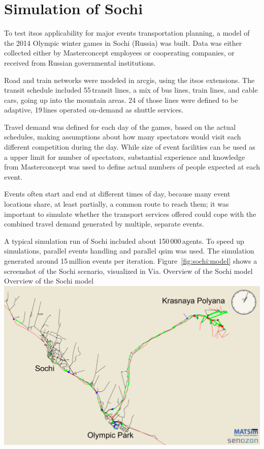 \section{Simulation of Sochi}
To test \gls{itsos} applicability for major events transportation planning,
a model of the 2014 Olympic winter games in Sochi (Russia) was built. Data was
either collected either by Masterconcept employees or cooperating companies, or
received from Russian governmental institutions.

Road and train networks were modeled in \gls{arcgis}, using the \gls{itsos} extensions.
The transit schedule included 55\,transit lines, a mix of bus lines, train lines,
and cable cars, going up into the mountain areas. 24 of those lines were
defined to be adaptive, 19\,lines operated on-demand as shuttle services.

Travel demand was defined for each day of the games, based on the actual schedules,
making assumptions about how many spectators would visit each different
competition during the day. While size of event facilities can be used as a
upper limit for number of spectators, substantial experience and knowledge from
Masterconcept was used to define actual numbers of people expected at each
event.

Events often start and end at different times of day, because many event locations share, at least partially, a
common route to reach them; it was important to simulate whether the transport services offered could
cope with the combined travel demand generated by multiple, separate events.

A typical simulation run of Sochi included about 150\,000\,agents. To speed up simulations, parallel events handling and parallel qsim was used. The simulation generated around 15\,million events per iteration.
%
Figure~\ref{fig:sochi:model} shows a screenshot of the Sochi scenario, visualized in Via.
%
\createfigure%
{Overview of the Sochi model}%
{Overview of the Sochi model}%
{\label{fig:sochi:model}}%
{\includegraphics[width=1.\textwidth,angle=0]{./scenarios/figures/sochi_full.pdf}}%
{}
%

